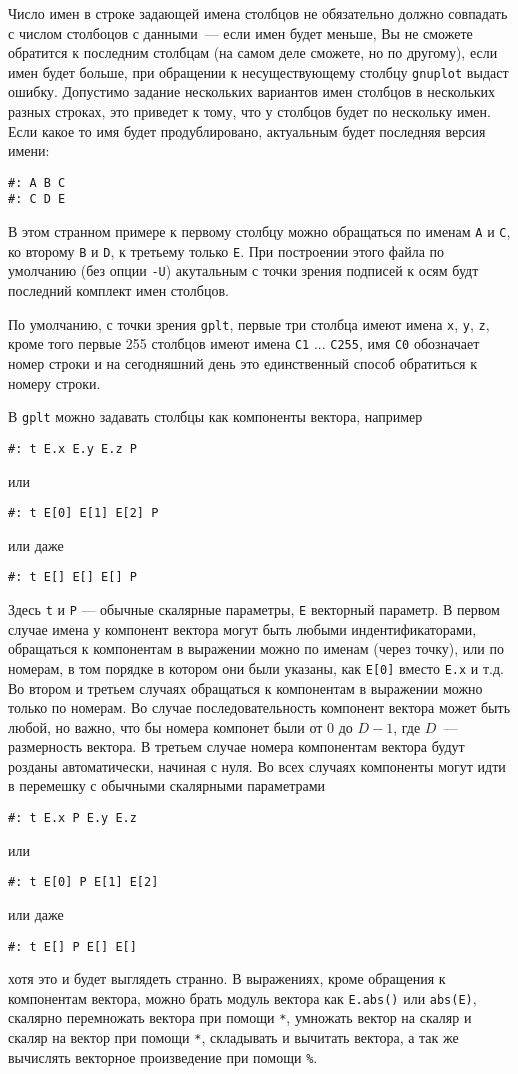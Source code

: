 \documentclass[12pt]{article}
\def\gplt{{\tt gplt}}
\def\gnuplot{{\tt gnuplot}}
\begin{document}
Число имен в строке задающей имена столбцов не обязательно должно совпадать с числом столбоцов с данными~--- если имен будет меньше, Вы не сможете обратится к
последним столбцам (на самом деле сможете, но по другому), если имен будет больше, при обращении к несуществующему столбцу \gnuplot{} выдаст ошибку.
Допустимо задание нескольких вариантов имен столбцов в нескольких разных строках, это приведет к тому, что у столбцов будет по нескольку имен.
Если какое то имя будет продублировано, актуальным будет последняя версия имени:
\begin{verbatim}
#: A B C
#: C D E
\end{verbatim}
В этом странном примере к первому столбцу можно обращаться по именам \verb'A' и \verb'C', ко второму  \verb'B' и \verb'D', к третьему только \verb'E'.
При построении этого файла по умолчанию (без опции \verb'-U') акутальным с точки зрения подписей к осям будт последний комплект имен столбцов. 

По умолчанию, с точки зрения \gplt,  первые три столбца имеют имена \verb'x', \verb'y', \verb'z', кроме того первые 255 столбцов имеют имена \verb'C1' ... \verb'C255',
имя \verb'C0' обозначает номер строки и на сегодняшний день это единственный способ обратиться к номеру строки. 

В \gplt{} можно задавать столбцы как компоненты вектора, например
\begin{verbatim}
#: t E.x E.y E.z P 
\end{verbatim}
или
\begin{verbatim}
#: t E[0] E[1] E[2] P 
\end{verbatim}
или даже
\begin{verbatim}
#: t E[] E[] E[] P 
\end{verbatim}
Здесь \verb't' и \verb'P' --- обычные скалярные параметры, \verb'E' векторный параметр.
В первом случае имена у компонент вектора могут быть любыми индентификаторами, обращаться к компонентам в выражении можно
по именам (через точку), или по номерам, в том порядке в котором они были указаны, как \verb'E[0]' вместо \verb'E.x' и т.д.
Во втором и третьем случаях обращаться к компонентам в выражении можно только по номерам.
Во случае последовательность компонент
 вектора может быть любой, но важно, что бы номера компонет были от $0$ до $D-1$, где $D$~--- размерность вектора. В третьем случае
 номера компонентам вектора будут розданы автоматически, начиная с нуля.
Во всех случаях компоненты могут идти в перемешку с обычными скалярными параметрами
\begin{verbatim}
#: t E.x P E.y E.z  
\end{verbatim}
или
\begin{verbatim}
#: t E[0] P E[1] E[2]
\end{verbatim}
или даже
\begin{verbatim}
#: t E[] P E[] E[]  
\end{verbatim}
хотя это и будет выглядеть странно.
В выражениях, кроме обращения к компонентам вектора, можно брать модуль вектора как \verb'E.abs()' или \verb'abs(E)', скалярно перемножать вектора при помощи \verb'*',
умножать вектор на скаляр и скаляр на вектор при помощи \verb'*', складывать и вычитать вектора, а так же вычислять векторное произведение при помощи \verb'%'.
\end{document}
